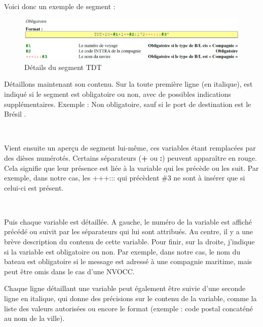 Voici donc un exemple de segment :
\begin{figure}[!ht]
	\begin{center}
		\includegraphics[scale=.53]{Contenu/ProjetTuteure/Images/Segment_TDT.png}
	\end{center}

	\caption{Détails du segment \og TDT \fg}
\end{figure}

Détaillons maintenant son contenu. Sur la toute première ligne (en italique), est indiqué si le segment est obligatoire ou non, avec de possibles indications supplémentaires. Exemple : \og Non obligatoire, sauf si le port de destination est le Brésil \fg.

~

Vient ensuite un aperçu de segment lui-même, ces variables étant remplacées par des dièses numérotés. Certains séparateurs (\textbf{+} ou \textbf{:}) peuvent apparaître en rouge. Cela signifie que leur présence est liée à la variable qui les précède ou les suit. Par exemple, dans notre cas, les \og +++::: \fg{} qui précèdent \#3 ne sont à insérer que si celui-ci est présent.

~

Puis chaque variable est détaillée. A gauche, le numéro de la variable est affiché précédé ou suivit par les séparateurs qui lui sont attribués. Au centre, il y a une brève description du contenu de cette variable. Pour finir, sur la droite, j'indique si la variable est obligatoire ou non. Par exemple, dans notre cas, le nom du bateau est obligatoire si le message est adressé à une compagnie maritime, mais peut être omis dans le cas d'une NVOCC.

Chaque ligne détaillant une variable peut également être suivie d'une seconde ligne en italique, qui donne des précisions sur le contenu de la variable, comme la liste des valeurs autorisées ou encore le format (exemple : code postal concaténé au nom de la ville).